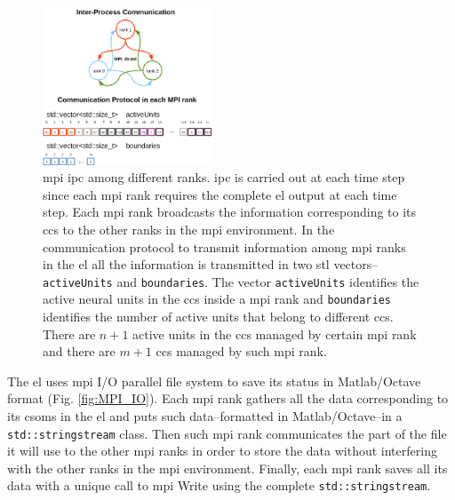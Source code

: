 \documentclass[10pt,journal,compsoc]{IEEEtran}
\begin{document}
\begin{figure}[h!]
    \centering
    \includegraphics[width=0.45\textwidth]{BCast.png}
    \caption{ \gls{mpi} \gls{ipc} among different ranks. \gls{ipc} is carried out at each time step since each \gls{mpi} rank requires the complete \gls{el} output at each time step. Each \gls{mpi} rank broadcasts the information corresponding to its \glspl{cc} to the other ranks in the \gls{mpi} environment. In the communication protocol to transmit information among \gls{mpi} ranks in the \gls{el} all the information is transmitted in two \gls{stl} vectors--\texttt{activeUnits} and \texttt{boundaries}. The vector \texttt{activeUnits} identifies the active neural units in the \glspl{cc} inside a \gls{mpi} rank and \texttt{boundaries} identifies the number of active units that belong to different \glspl{cc}. There are $n+1$ active units in the \glspl{cc} managed by certain \gls{mpi} rank and there are $m+1$ \glspl{cc} managed by such \gls{mpi} rank.}
    \label{fig:BCast}
\end{figure}

The \gls{el} uses \gls{mpi} I/O parallel file system to save its status in Matlab/Octave format (Fig. \ref{fig:MPI_IO}). Each \gls{mpi} rank gathers all the data corresponding to its \glspl{csom} in the \gls{el} and puts such data--formatted in Matlab/Octave--in a \texttt{std::stringstream} class. Then such \gls{mpi} rank communicates the part of the file it will use to the other \gls{mpi} ranks in order to store the data without interfering with the other ranks in the \gls{mpi} environment. Finally, each \gls{mpi} rank saves all its data with a unique call to \gls{mpi} Write using the complete \texttt{std::stringstream}.
\end{document}
